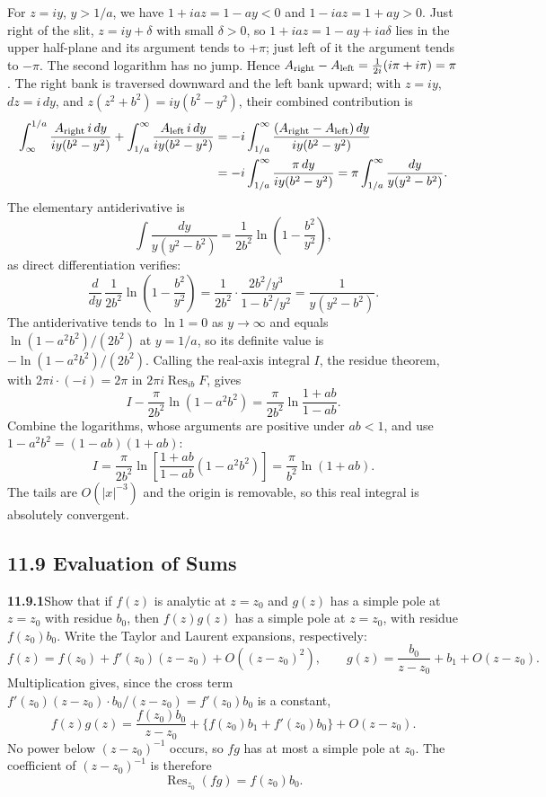 For $z=iy$, $y>1/a$, we have $1+iaz=1-ay<0$ and $1-iaz=1+ay>0$.
Just right of the slit, $z=iy+\delta$ with small $\delta>0$, so
$1+iaz=1-ay+ia\delta$ lies in the upper half-plane and its argument
tends to $+\pi$; just left of it the argument tends to $-\pi$. The
second logarithm has no jump. Hence
$A_{\rm right}-A_{\rm left}=\frac1{2i}(i\pi+i\pi)=\pi$.
The right bank is traversed downward and the left bank upward; with
$z=iy$, $dz=i\,dy$, and $z(z^2+b^2)=iy(b^2-y^2)$, their combined
contribution is
\[
\begin{aligned}
\int_\infty^{1/a}\frac{A_{\rm right}\,i\,dy}{iy(b^2-y^2)}
+\int_{1/a}^\infty\frac{A_{\rm left}\,i\,dy}{iy(b^2-y^2)}
&=-i\int_{1/a}^\infty
\frac{(A_{\rm right}-A_{\rm left})\,dy}{iy(b^2-y^2)}\\
&=-i\int_{1/a}^\infty
\frac{\pi\,dy}{iy(b^2-y^2)}
=\pi\int_{1/a}^\infty\frac{dy}{y(y^2-b^2)}.
\end{aligned}
\]
The elementary antiderivative is
\[
\int\frac{dy}{y(y^2-b^2)}
=\frac1{2b^2}\ln\left(1-\frac{b^2}{y^2}\right),
\]
as direct differentiation verifies:
\[
\frac{d}{dy}\,\frac1{2b^2}\ln\left(1-\frac{b^2}{y^2}\right)
=\frac1{2b^2}\cdot\frac{2b^2/y^3}{1-b^2/y^2}
=\frac1{y(y^2-b^2)}.
\]
The antiderivative tends to $\ln1=0$ as $y\to\infty$ and equals
$\ln(1-a^2b^2)/(2b^2)$ at $y=1/a$, so its definite value is
$-\ln(1-a^2b^2)/(2b^2)$. Calling the real-axis integral $I$,
the residue theorem, with $2\pi i\cdot(-i)=2\pi$ in
$2\pi i\operatorname{Res}_{ib}F$, gives
\[
I-\frac{\pi}{2b^2}\ln(1-a^2b^2)
=\frac{\pi}{2b^2}\ln\frac{1+ab}{1-ab}.
\]
Combine the logarithms, whose arguments are positive under $ab<1$,
and use $1-a^2b^2=(1-ab)(1+ab)$:
\[
\boxed{I=\frac{\pi}{2b^2}
\ln\left[\frac{1+ab}{1-ab}(1-a^2b^2)\right]
=\frac{\pi}{b^2}\ln(1+ab)}.
\]
The tails are $O(|x|^{-3})$ and the origin is removable, so this
real integral is absolutely convergent.

\subsection*{11.9 Evaluation of Sums}

\par\bigskip
\noindent\textbf{11.9.1}\quad Show that if $f(z)$ is analytic at $z=z_{0}$ and
$g(z)$ has a simple pole at $z=z_{0}$ with residue $b_{0}$, then $f(z)g(z)$
has  a simple pole at $z=z_{0}$, with residue $f(z_{0})b_{0}$.
\solution
Write the Taylor and Laurent expansions, respectively:
\[
f(z)=f(z_0)+f'(z_0)(z-z_0)+O((z-z_0)^2),\qquad
g(z)=\frac{b_0}{z-z_0}+b_1+O(z-z_0).
\]
Multiplication gives, since the cross term
$f'(z_0)(z-z_0)\cdot b_0/(z-z_0)=f'(z_0)b_0$ is a constant,
\[
f(z)g(z)=\frac{f(z_0)b_0}{z-z_0}
+\{f(z_0)b_1+f'(z_0)b_0\}+O(z-z_0).
\]
No power below $(z-z_0)^{-1}$ occurs, so $fg$ has at most a simple
pole at $z_0$. The coefficient of $(z-z_0)^{-1}$ is therefore
\[
\boxed{\operatorname{Res}_{z_0}(fg)=f(z_0)b_0}.
\]

